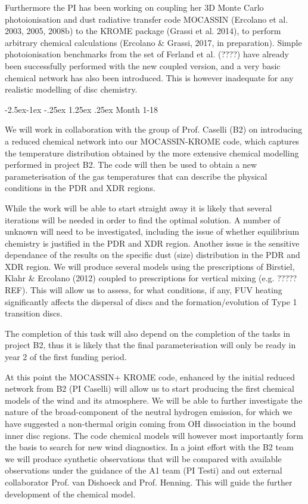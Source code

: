 \documentclass[10pt,fleqn,twoside]{article}
\makeatletter
\renewcommand\paragraph{\@startsection{paragraph}{4}{\z@}%
            {-2.5ex\@plus -1ex \@minus -.25ex}%
            {1.25ex \@plus .25ex}%
            {\normalfont\normalsize\bfseries}}
\makeatother
\begin{document}
Furthermore the PI has been working on coupling her 3D Monte Carlo photoionisation
and dust radiative transfer code MOCASSIN (Ercolano et al. 2003, 2005,
2008b) to the KROME package (Grassi et al. 2014), to perform arbitrary
chemical calculations (Ercolano \& Grassi, 2017, in
preparation). Simple photoionisation benchmarks from the set of
Ferland et al. (????) have already been successfully performed with
the new coupled version, and a very basic chemical network has also
been introduced. This is however inadequate for any realistic
modelling of disc chemistry. 

\paragraph{Month 1-18}

We will work in collaboration with the group of Prof. Caselli (B2) on
introducing a reduced chemical network into our
MOCASSIN-KROME code, which captures the temperature distribution obtained
by the more extensive chemical modelling performed in project B2. 
The code will then be used to obtain a new parameterisation of the gas
temperatures that can describe the physical conditions in the PDR and
XDR regions.

While the work will be able to start straight away it is likely that
several iterations will be needed in order to find the optimal
solution. A number of unknown will need to be investigated, including
the issue of whether equilibrium chemistry is justified in the PDR and
XDR region. Another issue is the sensitive dependance of the results on the
specific dust (size) distribution in the PDR and XDR region. We will
produce several models using the prescriptions of Birstiel, Klahr \&
Ercolano (2012) coupled to prescriptions for vertical mixing
(e.g. ?????REF). This will allow us to assess, for what conditions, if
any, FUV heating significantly affects the dispersal of discs and
the formation/evolution of Type 1 transition discs. 

The completion of this task will also depend on the
completion of the tasks in project B2, thus it is likely that the
final parameterisation will only be ready in year 2 of the first
funding period. 

At this point the MOCASSIN+ KROME code, enhanced by the initial
reduced network from B2 (PI Caselli) will allow us to start producing
the first chemical models of the wind and its atmosphere. We will be
able to further investigate the nature of the broad-component of the
neutral hydrogen emission, for which we have suggested a non-thermal
origin coming from OH dissociation in the bound inner disc regions. 
The code chemical models will however most importantly form the basis
to search for new wind diagnostics. In a joint effort with the B2 team
we will produce synthetic observations that will be compared with
available observations under the guidance of the A1 team (PI Testi)
and out external collaborator Prof. van Dishoeck and Prof. Henning. 
This will guide the further development of the chemical model. 
\end{document}
